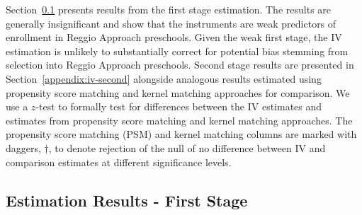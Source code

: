 Section~\ref{appendix:iv-first} presents results from the first stage estimation. The results are generally insignificant and show that the instruments are weak predictors of enrollment in Reggio Approach preschools. Given the weak first stage, the IV estimation is unlikely to substantially correct for potential bias stemming from selection into Reggio Approach preschools. Second stage results are presented in Section~\ref{appendix:iv-second} alongside analogous results estimated using propensity score matching and kernel matching approaches for comparison. We use a $z$-test to formally test for differences between the IV estimates and estimates from propensity score matching and kernel matching approaches. The propensity score matching (PSM) and kernel matching columns are marked with daggers, $\bm{\dagger}$, to denote rejection of the null of no difference between IV and comparison estimates at different significance levels.

\subsection{Estimation Results - First Stage}\label{appendix:iv-first}
\begin{table}[H]
\centering
{}
\end{table}



